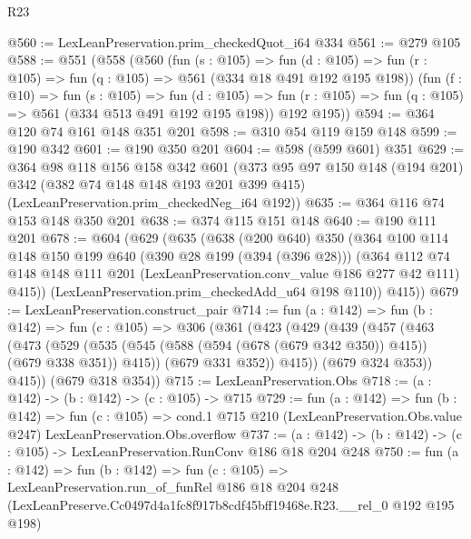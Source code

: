 \begin{lexlean}{R23}
\begin{coremodule}
@560 := LexLeanPreservation.prim_checkedQuot_i64 @334
@561 := @279 @105
@588 := @551
    (@558
      (@560
        (fun (s : @105) =>
        fun (d : @105) => fun (r : @105) => fun (q : @105) => @561 (@334 @18 @491 @192 @195 @198))
        (fun (f : @10) =>
        fun (s : @105) =>
        fun (d : @105) => fun (r : @105) => fun (q : @105) => @561 (@334 @513 @491 @192 @195 @198))
        @192
        @195))
@594 := @364 @120 @74 @161 @148 @351 @201
@598 := @310 @54 @119 @159 @148
@599 := @190 @342
@601 := @190 @350 @201
@604 := @598 (@599 @601) @351
@629 := @364
    @98
    @118
    @156
    @158
    @342
    @601
    (@373
      @95
      @97
      @150
      @148
      (@194 @201)
      @342
      (@382 @74 @148 @148 @193 @201 @399 @415)
      (LexLeanPreservation.prim_checkedNeg_i64 @192))
@635 := @364 @116 @74 @153 @148 @350 @201
@638 := @374 @115 @151 @148
@640 := @190 @111 @201
@678 := @604
    (@629
      (@635
        (@638
          (@200 @640)
          @350
          (@364
            @100
            @114
            @148
            @150
            @199
            @640
            (@390 @28 @199 (@394 (@396 @28)))
            (@364
              @112
              @74
              @148
              @148
              @111
              @201
              (LexLeanPreservation.conv_value @186 @277 @42 @111)
              @415))
          (LexLeanPreservation.prim_checkedAdd_u64 @198 @110))
        @415))
@679 := LexLeanPreservation.construct_pair
@714 := fun (a : @142) =>
  fun (b : @142) =>
  fun (c : @105) =>
  @306
    (@361
      (@423
        (@429
          (@439
            (@457
              (@463
                (@473
                  (@529
                    (@535 (@545 (@588 (@594 (@678 (@679 @342 @350)) @415)) (@679 @338 @351)) @415))
                  (@679 @331 @352))
                @415))
            (@679 @324 @353))
          @415))
      (@679 @318 @354))
@715 := LexLeanPreservation.Obs
@718 := (a : @142) -> (b : @142) -> (c : @105) -> @715
@729 := fun (a : @142) =>
  fun (b : @142) =>
  fun (c : @105) =>
  cond.{1} @715 @210 (LexLeanPreservation.Obs.value @247) LexLeanPreservation.Obs.overflow
@737 := (a : @142) -> (b : @142) -> (c : @105) -> LexLeanPreservation.RunConv @186 @18 @204 @248
@750 := fun (a : @142) =>
  fun (b : @142) =>
  fun (c : @105) =>
  LexLeanPreservation.run_of_funRel
    @186
    @18
    @204
    @248
    (LexLeanPreserve.Cc0497d4a1fc8f917b8cdf45bff19468e.R23.__rel_0 @192 @195 @198)
\end{coremodule}
\end{lexlean}
